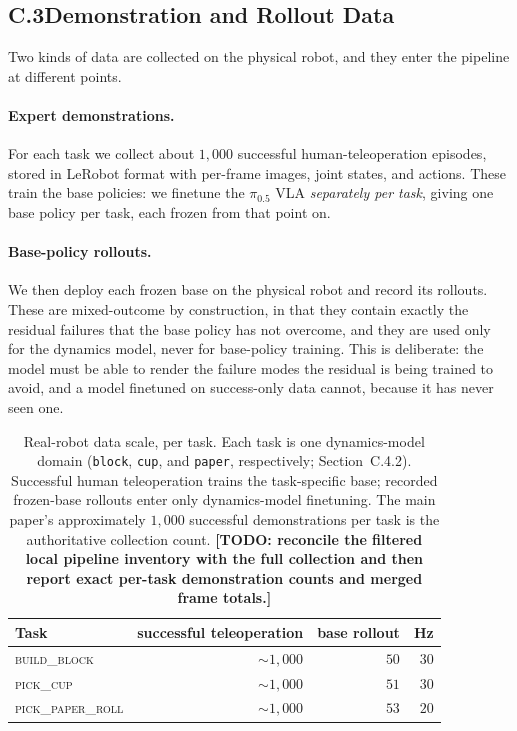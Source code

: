 \documentclass[letterpaper]{article} %
\newcommand{\todo}[1]{\textbf{[TODO: #1]}}
\begin{document}
\subsection{C.3\quad Demonstration and Rollout Data}

Two kinds of data are collected on the physical robot, and they enter the
pipeline at different points.

\paragraph{Expert demonstrations.}
For each task we collect about $1{,}000$ successful human-teleoperation
episodes, stored in LeRobot format with per-frame images, joint states, and
actions. These train the base policies: we finetune the $\pi_{0.5}$ VLA
\emph{separately per task}, giving one base policy per task, each frozen from
that point on.

\paragraph{Base-policy rollouts.}
We then deploy each frozen base on the physical robot and record its rollouts.
These are mixed-outcome by construction, in that they contain exactly the residual
failures that the base policy has not overcome, and they are used only for the
dynamics model, never for base-policy training. This is deliberate: the model
must be able to render the failure modes the residual is being trained to avoid,
and a model finetuned on success-only data cannot, because it has never seen one.

\begin{table}[t]
\centering\small\setlength{\tabcolsep}{4pt}
\begin{tabular}{@{}lrrr@{}}
\toprule
Task & successful teleoperation & base rollout & Hz \\
\midrule
\textsc{build\_block}      & $\sim1{,}000$ & $50$ & $30$ \\
\textsc{pick\_cup}         & $\sim1{,}000$ & $51$ & $30$ \\
\textsc{pick\_paper\_roll} & $\sim1{,}000$ & $53$ & $20$ \\
\bottomrule
\end{tabular}
\caption{Real-robot data scale, per task. Each task is one dynamics-model
domain (\texttt{block}, \texttt{cup}, and \texttt{paper}, respectively;
Section~C.4.2). Successful human teleoperation trains the task-specific base;
recorded frozen-base rollouts enter only dynamics-model finetuning. The main
paper's approximately $1{,}000$ successful demonstrations per task is the
authoritative collection count. \todo{reconcile the filtered local pipeline
inventory with the full collection and then report exact per-task demonstration
counts and merged frame totals.}}
\label{tab:realdata}
\end{table}
\end{document}
